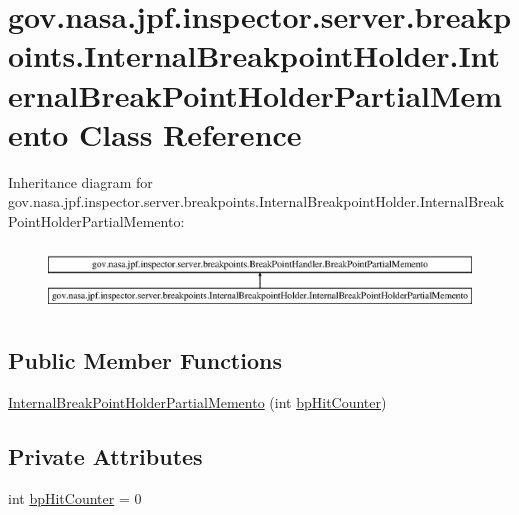 \hypertarget{classgov_1_1nasa_1_1jpf_1_1inspector_1_1server_1_1breakpoints_1_1_internal_breakpoint_holder_1_13ca7fc5bb2b7ecd1495c4d5e8a0f1a71}{}\section{gov.\+nasa.\+jpf.\+inspector.\+server.\+breakpoints.\+Internal\+Breakpoint\+Holder.\+Internal\+Break\+Point\+Holder\+Partial\+Memento Class Reference}
\label{classgov_1_1nasa_1_1jpf_1_1inspector_1_1server_1_1breakpoints_1_1_internal_breakpoint_holder_1_13ca7fc5bb2b7ecd1495c4d5e8a0f1a71}
Inheritance diagram for gov.\+nasa.\+jpf.\+inspector.\+server.\+breakpoints.\+Internal\+Breakpoint\+Holder.\+Internal\+Break\+Point\+Holder\+Partial\+Memento\+:\begin{figure}[H]
\begin{center}
\leavevmode
\includegraphics[height=1.772152cm]{classgov_1_1nasa_1_1jpf_1_1inspector_1_1server_1_1breakpoints_1_1_internal_breakpoint_holder_1_13ca7fc5bb2b7ecd1495c4d5e8a0f1a71}
\end{center}
\end{figure}
\subsection*{Public Member Functions}
\begin{DoxyCompactItemize}
\item 
\hyperlink{classgov_1_1nasa_1_1jpf_1_1inspector_1_1server_1_1breakpoints_1_1_internal_breakpoint_holder_1_13ca7fc5bb2b7ecd1495c4d5e8a0f1a71_a5eef7e62bec7c0c77ae1ee6d6250b455}{Internal\+Break\+Point\+Holder\+Partial\+Memento} (int \hyperlink{classgov_1_1nasa_1_1jpf_1_1inspector_1_1server_1_1breakpoints_1_1_internal_breakpoint_holder_1_13ca7fc5bb2b7ecd1495c4d5e8a0f1a71_ab3b2affd621a464b7e52ffb0be11f3ac}{bp\+Hit\+Counter})
\end{DoxyCompactItemize}
\subsection*{Private Attributes}
\begin{DoxyCompactItemize}
\item 
int \hyperlink{classgov_1_1nasa_1_1jpf_1_1inspector_1_1server_1_1breakpoints_1_1_internal_breakpoint_holder_1_13ca7fc5bb2b7ecd1495c4d5e8a0f1a71_ab3b2affd621a464b7e52ffb0be11f3ac}{bp\+Hit\+Counter} = 0
\end{DoxyCompactItemize}


